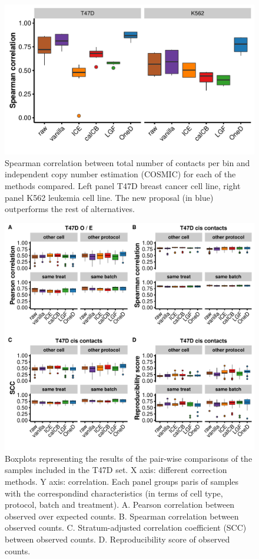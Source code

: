\documentclass[12pt]{report}
\begin{document}
\begin{figure}[b]
	\centerline{\includegraphics[width=\textwidth]{img/copy_number_suppfigure2.pdf}}
	\caption{
Spearman correlation between total number of contacts per bin and
independent copy number estimation (COSMIC) for each of the methods
compared. Left panel T47D breast cancer cell line, right panel K562
leukemia cell line. The new proposal (in blue) outperforms the rest of
alternatives.}
\end{figure}

\begin{figure}
\centerline{\includegraphics[width=\textwidth]{img/correlation_aberrant_boxplots1.pdf}}
\caption{Boxplots representing the results of the pair-wise comparisons of the
	samples included in the T47D set. X axis: different correction methods. Y
    axis: correlation. Each panel groups paris of samples with the correspondind
    characteristics (in terms of cell type, protocol, batch and
    treatment). A. Pearson correlation between observed over expected
    counts. B. Spearman correlation between observed counts. C. Stratum-adjusted correlation
    coefficient (SCC) between observed counts. D. Reproducibility score of
    observed counts.}
\end{figure}
\end{document}
